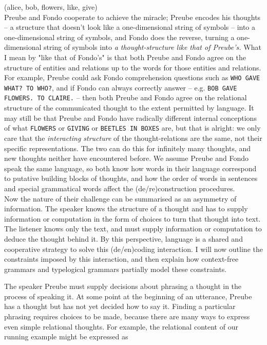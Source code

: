 \begin{fullwidth}
(alice, bob, flowers, like, give)\\

Preube and Fondo cooperate to achieve the miracle; Preube encodes his thoughts -- a structure that doesn't look like a one-dimensional string of symbols -- into a one-dimensional string of symbols, and Fondo does the reverse, turning a one-dimensional string of symbols into \emph{a thought-structure like that of Preube's.} What I mean by "like that of Fondo's" is that both Preube and Fondo agree on the structure of entities and relations up to the words for those entities and relations. For example, Preube could ask Fondo comprehension questions such as \texttt{WHO GAVE WHAT? TO WHO?}, and if Fondo can always correctly answer -- e.g. \texttt{BOB GAVE FLOWERS. TO CLAIRE.} -- then both Preube and Fondo agree on the relational structure of the communicated thought to the extent permitted by language. It may still be that Preube and Fondo have radically different internal conceptions of what \texttt{FLOWERS} or \texttt{GIVING} or \texttt{BEETLES IN BOXES} are, but that is alright: we only care that the \emph{interacting structure} of the thought-relations are the same, not their specific representations. The two can do this for infinitely many thoughts, and new thoughts neither have encountered before. We assume Preube and Fondo speak the same language, so both know how words in their language correspond to putative building blocks of thoughts, and how the order of words in sentences and special grammatical words affect the (de/re)construction procedures.\\

Now the nature of their challenge can be summarised as an asymmetry of information. The speaker knows the structure of a thought and has to supply information or computation in the form of choices to turn that thought into text. The listener knows only the text, and must supply information or computation to deduce the thought behind it. By this perspective, language is a shared and cooperative strategy to solve this (de/en)coding interaction. I will now outline the constraints imposed by this interaction, and then explain how context-free grammars and typelogical grammars partially model these constraints.

 The speaker Preube must supply decisions about phrasing a thought in the process of speaking it. At some point at the beginning of an utterance, Preube has a thought but has not yet decided how to say it. Finding a particular phrasing requires choices to be made, because there are many ways to express even simple relational thoughts. For example, the relational content of our running example might be expressed as 


\end{fullwidth}
